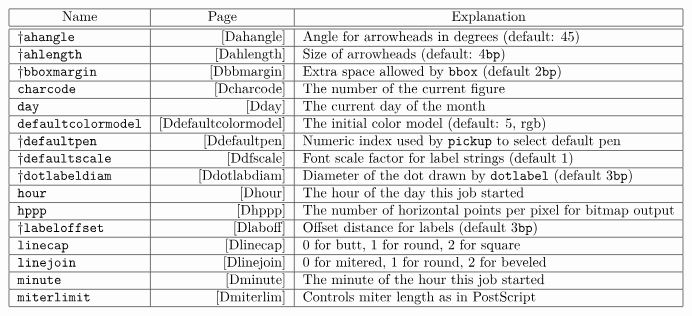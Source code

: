 \begin{table}[htp]
\caption{Internal variables with numeric values}
$$\begin{tabular}{|l|r|l|}
\hline
\multicolumn1{|c}{Name}&  \multicolumn1{|c}{Page}&  \multicolumn1{|c|}{Explanation}\\
\hline
\hline
\pl\tt  ahangle&        \pageref{Dahangle}&
        Angle for arrowheads in degrees (default: 45)\\\hline
\pl\tt  ahlength&       \pageref{Dahlength}&
        Size of arrowheads (default: 4{\tt bp})\\\hline
\pl\tt  bboxmargin&     \pageref{Dbbmargin}&
        Extra space allowed by {\tt bbox} (default 2{\tt bp})\\\hline
\tt     charcode&       \pageref{Dcharcode}&
        The number of the current figure\\\hline
\tt     day&            \pageref{Dday}&
        The current day of the month\\\hline
\tt     defaultcolormodel&    \pageref{Ddefaultcolormodel}&
        The initial color model  (default: 5, rgb)\\\hline
\pl\tt  defaultpen&     \pageref{Ddefaultpen}&
        Numeric index used by {\tt pickup} to select default pen\\\hline
\pl\tt  defaultscale&   \pageref{Ddfscale}&
        Font scale factor for label strings (default 1)\\\hline
\pl\tt  dotlabeldiam&   \pageref{Ddotlabdiam}&
        Diameter of the dot drawn by \verb|dotlabel| (default 3{\tt bp})\\\hline
\tt     hour&           \pageref{Dhour}&
        The hour of the day this job started\\\hline
\tt     hppp&           \pageref{Dhppp}&
        The number of horizontal points per pixel for bitmap output\\\hline
\pl\tt  labeloffset&    \pageref{Dlaboff}&
        Offset distance for labels (default 3{\tt bp})\\\hline
\tt     linecap&        \pageref{Dlinecap}&
        0 for butt, 1 for round, 2 for square\\\hline
\tt     linejoin&       \pageref{Dlinejoin}&
        0 for mitered, 1 for round, 2 for beveled\\\hline
\tt     minute&         \pageref{Dminute}&
        The minute of the hour this job started\\\hline
\tt     miterlimit&     \pageref{Dmiterlim}&
        Controls miter length as in PostScript\\\hline

\end{tabular}$$
\end{table}
